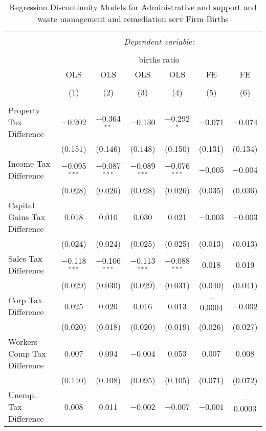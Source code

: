 
\begin{table}[!htbp] \centering 
  \caption{Regression Discontinuity Models for  Administrative and support and waste management and remediation serv Firm Births} 
  \label{56rd} 
\footnotesize 
\begin{tabular}{@{\extracolsep{5pt}}lcccccc} 
\\[-1.8ex]\hline 
\hline \\[-1.8ex] 
 & \multicolumn{6}{c}{\textit{Dependent variable:}} \\ 
\cline{2-7} 
\\[-1.8ex] & \multicolumn{6}{c}{births ratio} \\ 
 & OLS & OLS & OLS & OLS & FE & FE \\ 
\\[-1.8ex] & (1) & (2) & (3) & (4) & (5) & (6)\\ 
\hline \\[-1.8ex] 
 Property Tax Difference & $-$0.202 & $-$0.364$^{**}$ & $-$0.130 & $-$0.292$^{*}$ & $-$0.071 & $-$0.074 \\ 
  & (0.151) & (0.146) & (0.148) & (0.150) & (0.131) & (0.134) \\ 
  Income Tax Difference & $-$0.095$^{***}$ & $-$0.087$^{***}$ & $-$0.089$^{***}$ & $-$0.076$^{***}$ & $-$0.005 & $-$0.004 \\ 
  & (0.028) & (0.026) & (0.028) & (0.026) & (0.035) & (0.036) \\ 
  Capital Gains Tax Difference & 0.018 & 0.010 & 0.030 & 0.021 & $-$0.003 & $-$0.003 \\ 
  & (0.024) & (0.024) & (0.025) & (0.025) & (0.013) & (0.013) \\ 
  Sales Tax Difference & $-$0.118$^{***}$ & $-$0.106$^{***}$ & $-$0.113$^{***}$ & $-$0.088$^{***}$ & 0.018 & 0.019 \\ 
  & (0.029) & (0.030) & (0.029) & (0.031) & (0.040) & (0.041) \\ 
  Corp Tax Difference & 0.025 & 0.020 & 0.016 & 0.013 & $-$0.0004 & $-$0.002 \\ 
  & (0.020) & (0.018) & (0.020) & (0.019) & (0.026) & (0.027) \\ 
  Workers Comp Tax Difference & 0.007 & 0.094 & $-$0.004 & 0.053 & 0.007 & 0.008 \\ 
  & (0.110) & (0.108) & (0.095) & (0.105) & (0.071) & (0.072) \\ 
  Unemp. Tax Difference & 0.008 & 0.011 & $-$0.002 & $-$0.007 & $-$0.001 & $-$0.0003 \\ 

\end{tabular}
\end{table}
